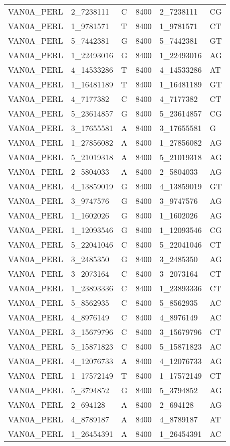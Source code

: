 \begin{center}
\begin{longtable}{|l|l|l|l|l|l|}
VAN0A\_PERL&2\_7238111&C&8400&2\_7238111&CG\\
VAN0A\_PERL&1\_9781571&T&8400&1\_9781571&CT\\
VAN0A\_PERL&5\_7442381&G&8400&5\_7442381&GT\\
VAN0A\_PERL&1\_22493016&G&8400&1\_22493016&AG\\
VAN0A\_PERL&4\_14533286&T&8400&4\_14533286&AT\\
VAN0A\_PERL&1\_16481189&T&8400&1\_16481189&GT\\
VAN0A\_PERL&4\_7177382&C&8400&4\_7177382&CT\\
VAN0A\_PERL&5\_23614857&G&8400&5\_23614857&CG\\
VAN0A\_PERL&3\_17655581&A&8400&3\_17655581&G\\
VAN0A\_PERL&1\_27856082&A&8400&1\_27856082&AG\\
VAN0A\_PERL&5\_21019318&A&8400&5\_21019318&AG\\
VAN0A\_PERL&2\_5804033&A&8400&2\_5804033&AG\\
VAN0A\_PERL&4\_13859019&G&8400&4\_13859019&GT\\
VAN0A\_PERL&3\_9747576&G&8400&3\_9747576&AG\\
VAN0A\_PERL&1\_1602026&G&8400&1\_1602026&AG\\
VAN0A\_PERL&1\_12093546&G&8400&1\_12093546&CG\\
VAN0A\_PERL&5\_22041046&C&8400&5\_22041046&CT\\
VAN0A\_PERL&3\_2485350&G&8400&3\_2485350&AG\\
VAN0A\_PERL&3\_2073164&C&8400&3\_2073164&CT\\
VAN0A\_PERL&1\_23893336&C&8400&1\_23893336&CT\\
VAN0A\_PERL&5\_8562935&C&8400&5\_8562935&AC\\
VAN0A\_PERL&4\_8976149&C&8400&4\_8976149&AC\\
VAN0A\_PERL&3\_15679796&C&8400&3\_15679796&CT\\
VAN0A\_PERL&5\_15871823&C&8400&5\_15871823&AC\\
VAN0A\_PERL&4\_12076733&A&8400&4\_12076733&AG\\
VAN0A\_PERL&1\_17572149&T&8400&1\_17572149&CT\\
VAN0A\_PERL&5\_3794852&G&8400&5\_3794852&AG\\
VAN0A\_PERL&2\_694128&A&8400&2\_694128&AG\\
VAN0A\_PERL&4\_8789187&A&8400&4\_8789187&AT\\
VAN0A\_PERL&1\_26454391&A&8400&1\_26454391&AC\\

\end{longtable}
\end{center}
